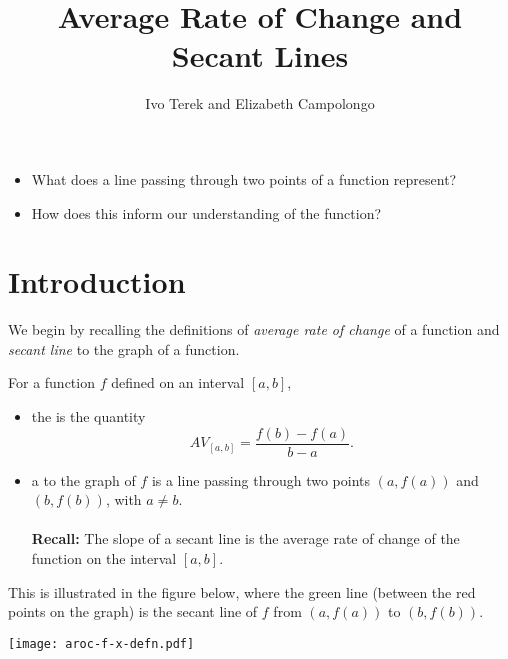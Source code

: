 \documentclass{ximera}
\author{Ivo Terek and Elizabeth Campolongo}
\title{Average Rate of Change and Secant Lines}
\begin{document}
\begin{abstract}
\end{abstract}
\maketitle
%
%
%
\begin{motivatingQuestions}\begin{itemize}
\item What does a line passing through two points of a function represent?
\item How does this inform our understanding of the function?
\end{itemize}\end{motivatingQuestions}
%
%
%
\section{Introduction}
%
We begin by recalling the definitions of \textit{average rate of change} of a function and {\it secant line} to the graph of a function. 
\begin{definition}
For a function $f$ defined on an interval $[a,b]$, 
\begin{itemize}
\item the  is the quantity%
\begin{equation*}
AV_{[a,b]} = \frac{f(b) - f(a)}{b-a}\text{.}
\end{equation*}

\item a  to the graph of $f$ is a line passing through two points $(a,f(a))$ and $(b,f(b))$, with $a \neq b$. \\
\\
  {\bf Recall:} The slope of a secant line is the average rate of change of the function on the interval $[a,b]$.
\end{itemize}

This is illustrated in the figure below, where the green line (between the red points on the graph) is the secant line of $f$ from $(a,f(a))$ to $(b,f(b))$.

\begin{image}
\texttt{[image: aroc-f-x-defn.pdf]}
\end{image}

\end{definition}
\end{document}
